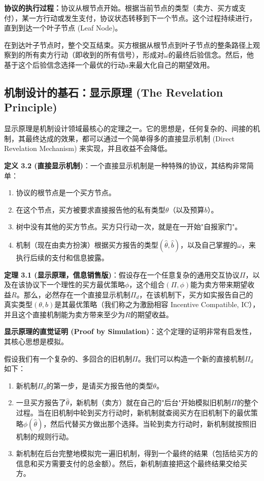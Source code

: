 \textbf{协议的执行过程：}协议从根节点开始。根据当前节点的类型（卖方、买方或支付），某一方行动或发生支付，协议状态转移到下一个节点。这个过程持续进行，直到到达一个叶子节点 (Leaf Node)。

在到达叶子节点时，整个交互结束。买方根据从根节点到叶子节点的整条路径上观察到的所有卖方行动（即收到的所有信号），形成对$\omega$的最终后验信念。然后，他基于这个后验信念选择一个最优的行动$a$来最大化自己的期望效用。

\subsection{机制设计的基石：显示原理 (The Revelation Principle)}

显示原理是机制设计领域最核心的定理之一。它的思想是，任何复杂的、间接的机制，其最终达成的效果，都可以通过一个简单得多的直接显示机制 (Direct Revelation Mechanism) 来实现，并且收益不会降低。

\textbf{定义 3.2 (直接显示机制)}：一个直接显示机制是一种特殊的协议，其结构非常简单：
\begin{enumerate}
    \item 协议的根节点是一个买方节点。
    \item 在这个节点，买方被要求直接报告他的私有类型$\theta$（以及预算$b$）。
    \item 树中没有其他的买方节点。买方只行动一次，就是在一开始"自报家门"。
    \item 机制（现在由卖方扮演）根据买方报告的类型$(\hat{\theta},\hat{b})$，以及自己掌握的$\omega$，来执行后续的支付和信息披露。
\end{enumerate}

\textbf{定理 3.1 (显示原理，信息销售版)}：假设存在一个任意复杂的通用交互协议$\Pi$，以及在该协议下一个理性的买方最优策略$\phi$，这个组合$(\Pi,\phi)$能为卖方带来期望收益$R$。那么，必然存在一个直接显示机制$\Pi_d$，在该机制下，买方如实报告自己的真实类型$(\theta,b)$是其最优策略（我们称之为激励相容 Incentive Compatible, IC），并且这个直接机制能为卖方带来至少为$R$的期望收益。

\textbf{显示原理的直觉证明 (Proof by Simulation)}：这个定理的证明非常有启发性，其核心思想是模拟。

假设我们有一个复杂的、多回合的旧机制$\Pi$。我们可以构造一个新的直接机制$\Pi_d$如下：

\begin{enumerate}
    \item 新机制$\Pi_d$的第一步，是请买方报告他的类型$\theta$。
    \item 一旦买方报告了$\hat{\theta}$，新机制（卖方）就在自己的"后台"开始模拟旧机制$\Pi$的整个过程。当在旧机制中轮到买方行动时，新机制就查阅买方在旧机制下的最优策略$\phi(\hat{\theta})$，然后代替买方做出那个选择。当轮到卖方行动时，新机制就按照旧机制的规则行动。
    \item 新机制在后台完整地模拟完一遍旧机制，得到一个最终的结果（包括给买方的信息和买方需要支付的总金额）。然后，新机制直接把这个最终结果交给买方。
\end{enumerate}

